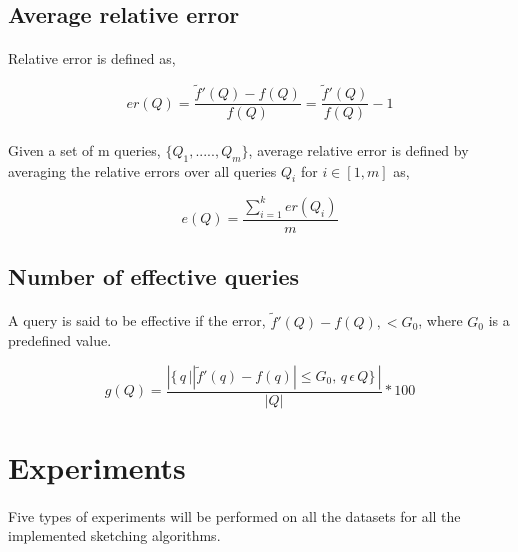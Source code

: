 \subsection{Average relative error}

\paragraph{}
Relative error is defined as,

\begin{equation}
    er(Q) =  \frac{\tilde{f}'(Q) - f(Q)}{f(Q)} = \frac{\tilde{f}'(Q)}{f(Q)} -1 
\end{equation}

\paragraph{}
Given a set of m queries, $\{ Q_1 , ....., Q_m \}$, average relative error is defined by averaging the relative errors over all queries $Q_i$ for \(i \in [1,m]\) as,

\begin{equation}
    e(Q) =  \frac{\sum_{i=1}^{k} er(Q_i)}{m}
\end{equation}

\subsection{Number of effective queries}

\paragraph{}
A query is said to be effective if the error, $\tilde{f}'(Q) - f(Q), < G_0$,  where $G_0$ is a predefined value.

\begin{equation}
    g(Q) =  \frac{\left | \{\,q\, |   \left |\tilde{f}'(q) - f(q)\right | \leq G_0, \,q \, \epsilon  \,Q\} \, \right|}{|Q|}*100
\end{equation}

\section{Experiments}

\paragraph{}
Five types of experiments will be performed on all the datasets for all the implemented sketching algorithms. 

